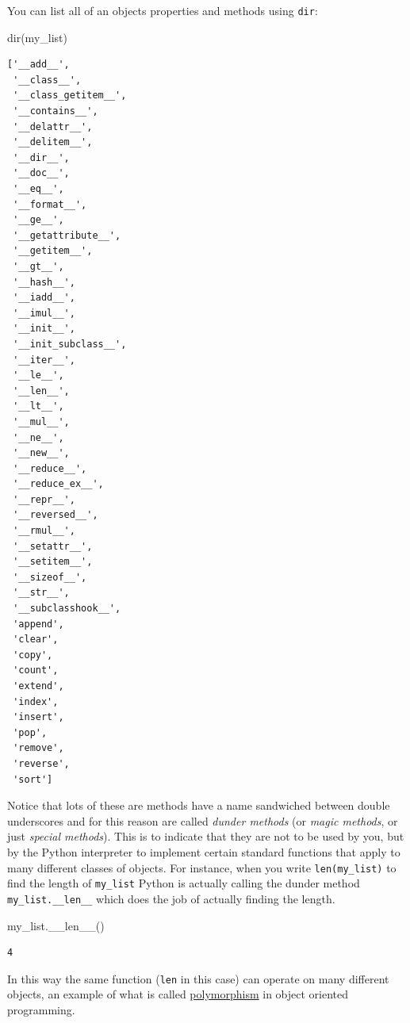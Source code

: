 \documentclass[
  letterpaper,
  DIV=11,
  numbers=noendperiod]{scrreprt}
\newenvironment{Shaded}{\begin{snugshade}}{\end{snugshade}}
\newcommand{\BuiltInTok}[1]{\textcolor[rgb]{0.00,0.23,0.31}{#1}}
\newcommand{\FunctionTok}[1]{\textcolor[rgb]{0.28,0.35,0.67}{#1}}
\newcommand{\NormalTok}[1]{\textcolor[rgb]{0.00,0.23,0.31}{#1}}
\theoremstyle{definition}
\theoremstyle{remark}
\begin{document}
\begin{tcolorbox}[enhanced jigsaw, bottomrule=.15mm, arc=.35mm, titlerule=0mm, breakable, coltitle=black, leftrule=.75mm, opacitybacktitle=0.6, colbacktitle=quarto-callout-tip-color!10!white, rightrule=.15mm, bottomtitle=1mm, toptitle=1mm, left=2mm, opacityback=0, toprule=.15mm, title=\textcolor{quarto-callout-tip-color}{\faLightbulb}\hspace{0.5em}{Dunder methods}, colback=white, colframe=quarto-callout-tip-color-frame]

You can list all of an objects properties and methods using
\texttt{dir}:

\begin{Shaded}
\begin{Highlighting}[]
\BuiltInTok{dir}\NormalTok{(my\_list)}
\end{Highlighting}
\end{Shaded}

\begin{verbatim}
['__add__',
 '__class__',
 '__class_getitem__',
 '__contains__',
 '__delattr__',
 '__delitem__',
 '__dir__',
 '__doc__',
 '__eq__',
 '__format__',
 '__ge__',
 '__getattribute__',
 '__getitem__',
 '__gt__',
 '__hash__',
 '__iadd__',
 '__imul__',
 '__init__',
 '__init_subclass__',
 '__iter__',
 '__le__',
 '__len__',
 '__lt__',
 '__mul__',
 '__ne__',
 '__new__',
 '__reduce__',
 '__reduce_ex__',
 '__repr__',
 '__reversed__',
 '__rmul__',
 '__setattr__',
 '__setitem__',
 '__sizeof__',
 '__str__',
 '__subclasshook__',
 'append',
 'clear',
 'copy',
 'count',
 'extend',
 'index',
 'insert',
 'pop',
 'remove',
 'reverse',
 'sort']
\end{verbatim}

Notice that lots of these are methods have a name sandwiched between
double underscores and for this reason are called \emph{dunder methods}
(or \emph{magic methods}, or just \emph{special methods}). This is to
indicate that they are not to be used by you, but by the Python
interpreter to implement certain standard functions that apply to many
different classes of objects. For instance, when you write
\texttt{len(my\_list)} to find the length of \texttt{my\_list} Python is
actually calling the dunder method \texttt{my\_list.\_\_len\_\_} which
does the job of actually finding the length.

\begin{Shaded}
\begin{Highlighting}[]
\NormalTok{my\_list.}\FunctionTok{\_\_len\_\_}\NormalTok{()}
\end{Highlighting}
\end{Shaded}

\begin{verbatim}
4
\end{verbatim}

In this way the same function (\texttt{len} in this case) can operate on
many different objects, an example of what is called
\href{https://en.wikipedia.org/wiki/Polymorphism_(computer_science)}{polymorphism}
in object oriented programming.

\end{tcolorbox}
\end{document}
